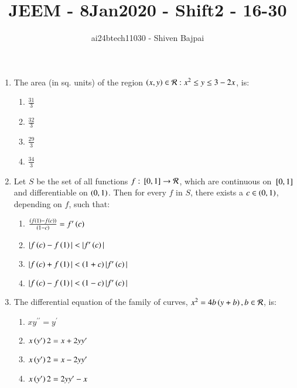\documentclass[journal]{IEEEtran}
\begin{document}
\onecolumn

\vspace{3cm}

\renewcommand{\thefigure}{\theenumi}
\renewcommand{\thetable}{\theenumi}

\title{JEEM - 8Jan2020 - Shift2 - 16-30}
\author{ai24btech11030 - Shiven Bajpai}
\maketitle

\begin{enumerate}
    \item The area (in sq. units) of the region ${\left(x,y\right) \in \mathcal{R} : x^2 \leq y \leq 3 - 2x}$, is:
    \begin{multicols}{4}
    \begin{enumerate}
        \item $\frac{31}{3}$
        \item $\frac{32}{3}$
        \item $\frac{29}{3}$
        \item $\frac{34}{3}$
    \end{enumerate}
    \end{multicols}
    
    \item Let $S$ be the set of all functions $f:{}\left[0,1\right] \rightarrow \mathcal{R}$, which are continuous on ${}\left[0, 1\right]$ and differentiable on $\left(0, 1\right)$. Then for every $f$ in $S$, there exists a $c \in \left(0,1\right)$, depending on $f$, such that:
    \begin{multicols}{2}
        \begin{enumerate}
            \item $\frac{\left(f\left(1\right)-f\left(c\right)\right)}{\left(1-c\right)} = f^\prime\left(c\right) $
            \item $|f\left(c\right) - f\left(1\right)| < |f^\prime\left(c\right)| $
            \columnbreak
            \item $|f\left(c\right) + f\left(1\right)| < \left(1 + c\right)|f ^\prime \left(c\right)| $
            \item $|f\left(c\right) - f\left(1\right)| < \left(1 - c\right)|f^\prime\left(c\right)|$
        \end{enumerate}
    \end{multicols}

    \item The differential equation of the family of curves, $x^2 = 4b\left(y + b\right), b \in \mathcal{R}$, is:
    \begin{multicols}{2}
    \begin{enumerate}
        \item $xy^{\prime\prime} = y^\prime$
        \item $x\left(y^\prime\right) 2 = x + 2yy^\prime$
        \columnbreak
        \item $x\left(y ^\prime \right) 2 = x - 2yy^\prime$
        \item $x\left(y ^\prime \right) 2 = 2yy ^\prime - x$
    \end{enumerate}
    \end{multicols}


\end{enumerate}
\end{document}
